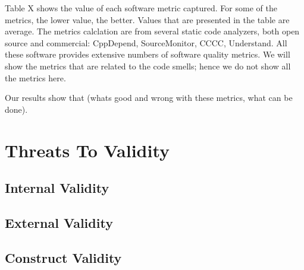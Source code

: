 Table X shows the value of each software metric captured. For some of the metrics, the lower value, the better. Values that are presented in the table are average. The metrics calclation are from several static code analyzers, both open source and commercial: CppDepend, SourceMonitor, CCCC, Understand. All these software provides extensive numbers of software quality metrics. We will show the metrics that are related to the code smells; hence we do not show all the metrics here. 

Our results show that (whats good and wrong with these metrics, what can be done). 


































\section{Threats To Validity}
\label{sub:threats_to_validity}

\subsection{Internal Validity}
\label{sub:internal_validty}

\subsection{External Validity}
\label{sub:external_validity}

\subsection{Construct Validity} %
\label{sub:construct_validity}

